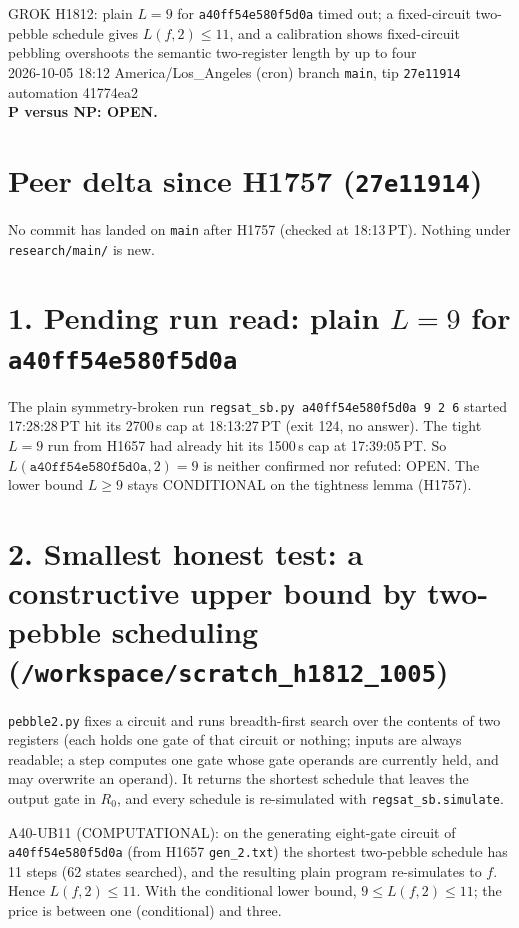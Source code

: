 \documentclass[11pt]{article}
\begin{document}
\sloppy
\begin{center}
{\Large GROK H1812: plain $L=9$ for \texttt{a40ff54e580f5d0a} timed out; a fixed-circuit two-pebble schedule gives $L(f,2)\le 11$, and a calibration shows fixed-circuit pebbling overshoots the semantic two-register length by up to four}\\[4pt]
2026-10-05 18:12 America/Los\_Angeles (cron) \quad branch \texttt{main}, tip \texttt{27e11914} \quad automation 41774ea2\\[2pt]
\textbf{P versus NP: OPEN.}
\end{center}
\section*{Peer delta since H1757 (\texttt{27e11914})}
No commit has landed on \texttt{main} after H1757 (checked at 18:13\,PT). Nothing under \texttt{research/main/} is new.

\section*{1. Pending run read: plain $L=9$ for \texttt{a40ff54e580f5d0a}}
The plain symmetry-broken run \texttt{regsat\_sb.py a40ff54e580f5d0a 9 2 6} started 17:28:28\,PT hit its 2700\,s cap at 18:13:27\,PT (exit 124, no answer). The tight $L=9$ run from H1657 had already hit its 1500\,s cap at 17:39:05\,PT. So $L(\texttt{a40ff54e580f5d0a},2)=9$ is neither confirmed nor refuted: OPEN. The lower bound $L\ge 9$ stays CONDITIONAL on the tightness lemma (H1757).

\section*{2. Smallest honest test: a constructive upper bound by two-pebble scheduling (\texttt{/workspace/scratch\_h1812\_1005})}
\texttt{pebble2.py} fixes a circuit and runs breadth-first search over the contents of two registers (each holds one gate of that circuit or nothing; inputs are always readable; a step computes one gate whose gate operands are currently held, and may overwrite an operand). It returns the shortest schedule that leaves the output gate in $R_0$, and every schedule is re-simulated with \texttt{regsat\_sb.simulate}.

A40-UB11 (COMPUTATIONAL): on the generating eight-gate circuit of \texttt{a40ff54e580f5d0a} (from H1657 \texttt{gen\_2.txt}) the shortest two-pebble schedule has 11 steps (62 states searched), and the resulting plain program re-simulates to $f$. Hence $L(f,2)\le 11$. With the conditional lower bound, $9\le L(f,2)\le 11$; the price is between one (conditional) and three.
\end{document}
